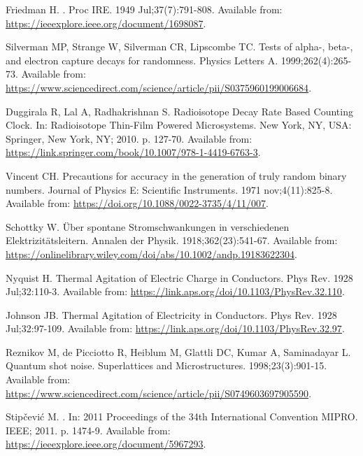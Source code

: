 \documentclass[]{interact}
\theoremstyle{plain}%
\theoremstyle{definition}
\theoremstyle{remark}
\begin{document}
\begin{thebibliography}{100}
Friedman H.
.
\newblock Proc IRE. 1949 Jul;37(7):791-808.
\newblock Available from: \url{https://ieeexplore.ieee.org/document/1698087}.

Silverman MP, Strange W, Silverman CR, Lipscombe TC.
\newblock Tests of alpha-, beta-, and electron capture decays for randomness.
\newblock Physics Letters A. 1999;262(4):265-73.
\newblock Available from:
  \url{https://www.sciencedirect.com/science/article/pii/S0375960199006684}.

Duggirala R, Lal A, Radhakrishnan S.
\newblock Radioisotope Decay Rate Based Counting Clock.
\newblock In: Radioisotope Thin-Film Powered Microsystems. New York, NY, USA:
  Springer, New York, NY; 2010. p. 127-70.
\newblock Available from:
  \url{https://link.springer.com/book/10.1007/978-1-4419-6763-3}.

Vincent CH.
\newblock Precautions for accuracy in the generation of truly random binary
  numbers.
\newblock Journal of Physics E: Scientific Instruments. 1971 nov;4(11):825-8.
\newblock Available from: \url{https://doi.org/10.1088/0022-3735/4/11/007}.

Schottky W.
\newblock Über spontane Stromschwankungen in verschiedenen
  Elektrizitätsleitern.
\newblock Annalen der Physik. 1918;362(23):541-67.
\newblock Available from:
  \url{https://onlinelibrary.wiley.com/doi/abs/10.1002/andp.19183622304}.

Nyquist H.
\newblock Thermal Agitation of Electric Charge in Conductors.
\newblock Phys Rev. 1928 Jul;32:110-3.
\newblock Available from:
  \url{https://link.aps.org/doi/10.1103/PhysRev.32.110}.

Johnson JB.
\newblock Thermal Agitation of Electricity in Conductors.
\newblock Phys Rev. 1928 Jul;32:97-109.
\newblock Available from: \url{https://link.aps.org/doi/10.1103/PhysRev.32.97}.

Reznikov M, {de Picciotto} R, Heiblum M, Glattli DC, Kumar A, Saminadayar L.
\newblock Quantum shot noise.
\newblock Superlattices and Microstructures. 1998;23(3):901-15.
\newblock Available from:
  \url{https://www.sciencedirect.com/science/article/pii/S0749603697905590}.

Stip{\ifmmode{}\else\v{c}\fi}evi{\ifmmode{}\else\'{c}\fi} M.
.
\newblock In: {2011 Proceedings of the 34th International Convention MIPRO}.
  IEEE; 2011. p. 1474-9.
\newblock Available from: \url{https://ieeexplore.ieee.org/document/5967293}.


\end{thebibliography}
\end{document}
